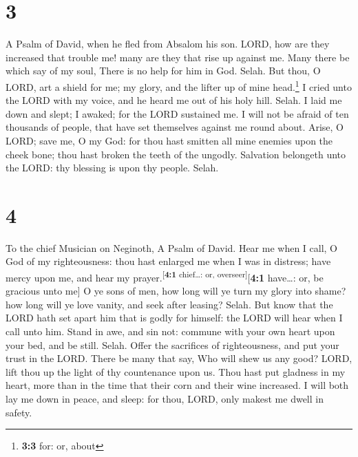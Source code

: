 \hypertarget{section-2}{%
\section{3}\label{section-2}}

A Psalm of David, when he fled from Absalom his son. 
LORD, how are they increased that trouble me! many are they that rise up
against me.  Many there be which say of my soul, There is
no help for him in God. Selah.  But thou, O LORD, art a
shield for me; my glory, and the lifter up of mine head.\footnote{\textbf{3:3}
  for: or, about}  I cried unto the LORD with my voice,
and he heard me out of his holy hill. Selah.  I laid me
down and slept; I awaked; for the LORD sustained me.  I
will not be afraid of ten thousands of people, that have set themselves
against me round about.  Arise, O LORD; save me, O my God:
for thou hast smitten all mine enemies upon the cheek bone; thou hast
broken the teeth of the ungodly.  Salvation belongeth unto
the LORD: thy blessing is upon thy people. Selah.

\hypertarget{section-3}{%
\section{4}\label{section-3}}

To the chief Musician on Neginoth, A Psalm of David.  Hear
me when I call, O God of my righteousness: thou hast enlarged me when I
was in distress; have mercy upon me, and hear my
prayer.\textsuperscript{{[}\textbf{4:1} chief\ldots: or,
overseer{]}}{[}\textbf{4:1} have\ldots: or, be gracious unto me{]}
 O ye sons of men, how long will ye turn my glory into
shame? how long will ye love vanity, and seek after leasing? Selah.
 But know that the LORD hath set apart him that is godly
for himself: the LORD will hear when I call unto him. 
Stand in awe, and sin not: commune with your own heart upon your bed,
and be still. Selah.  Offer the sacrifices of
righteousness, and put your trust in the LORD.  There be
many that say, Who will shew us any good? LORD, lift thou up the light
of thy countenance upon us.  Thou hast put gladness in my
heart, more than in the time that their corn and their wine increased.
 I will both lay me down in peace, and sleep: for thou,
LORD, only makest me dwell in safety.

